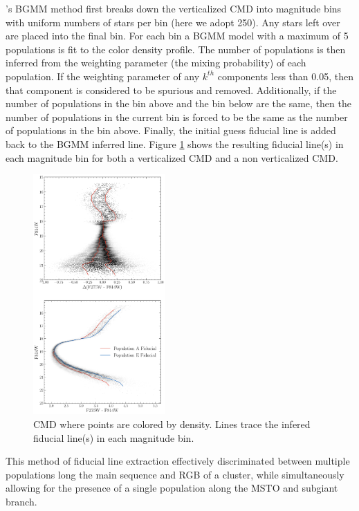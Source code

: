 \fidanka's BGMM method first breaks down the verticalized CMD into magnitude
bins with uniform numbers of stars per bin (here we adopt 250). Any stars left
over are placed into the final bin. For each bin a BGMM model with a maximum of
5 populations is fit to the color density profile. The number of populations is
then inferred from the weighting parameter (the mixing probability) of each
population. If the weighting parameter of any $k^{th}$ components less than
{\color{blue}0.05}, then that component is considered to be spurious and
removed. Additionally, if the number of populations in the bin above and the
bin below are the same, then the number of populations in the current bin is
forced to be the same as the number of populations in the bin above. Finally,
the initial guess fiducial line is added back to the BGMM inferred line. Figure
\ref{fig:vertFit} shows the resulting fiducial line(s) in each magnitude bin
for both a verticalized CMD and a non verticalized CMD.

\begin{figure}
	\centering
	\includegraphics[width=0.45\textwidth]{Notebooks/Figures/vertFit.png}
	\caption{CMD where points are colored by density. Lines trace the infered 
	fiducial line(s) in each magnitude bin.}
	\label{fig:vertFit}
\end{figure}

This method of fiducial line extraction effectively discriminated between
multiple populations long the main sequence and RGB of a cluster, while
simultaneously allowing for the presence of a single population along the MSTO
and subgiant branch. 

